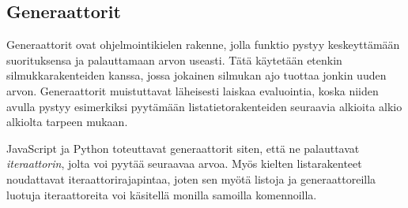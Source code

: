 \subsection{Generaattorit}\label{generaattorit}

Generaattorit ovat ohjelmointikielen rakenne, jolla funktio pystyy keskeyttämään suorituksensa ja palauttamaan arvon useasti. Tätä käytetään etenkin silmukkarakenteiden kanssa, jossa jokainen silmukan ajo tuottaa jonkin uuden arvon. Generaattorit muistuttavat läheisesti laiskaa evaluointia, koska niiden avulla pystyy esimerkiksi pyytämään listatietorakenteiden seuraavia alkioita alkio alkiolta tarpeen mukaan.

JavaScript ja Python toteuttavat generaattorit siten, että ne palauttavat \textit{iteraattorin}, jolta voi pyytää seuraavaa arvoa. Myös kielten listarakenteet noudattavat iteraattorirajapintaa, joten sen myötä listoja ja generaattoreilla luotuja iteraattoreita voi käsitellä monilla samoilla komennoilla.